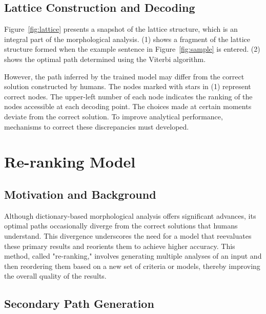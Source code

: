 \documentclass[AMS,STIX2COL]{WileyNJD-v2}
\begin{document}
    \subsection{Lattice Construction and Decoding}\label{subsec3.3}

    Figure~\ref{fig:lattice} presents a snapshot of the lattice structure, which is an integral part of the morphological analysis. (1) shows a fragment of the lattice structure formed when the example sentence in Figure~\ref{fig:sample} is entered. (2) shows the optimal path determined using the Viterbi algorithm.

    However, the path inferred by the trained model may differ from the correct solution constructed by humans. The nodes marked with stars in (1) represent correct nodes. The upper-left number of each node indicates the ranking of the nodes accessible at each decoding point. The choices made at certain moments deviate from the correct solution. To improve analytical performance, mechanisms to correct these discrepancies must developed.


    \section{Re-ranking Model}\label{sec:re-ranking-model}

    \subsection{Motivation and Background}\label{subsec4.1}

    Although dictionary-based morphological analysis offers significant advances, its optimal paths occasionally diverge from the correct solutions that humans understand. This divergence underscores the need for a model that reevaluates these primary results and reorients them to achieve higher accuracy. This method, called "re-ranking," involves generating multiple analyses of an input and then reordering them based on a new set of criteria or models, thereby improving the overall quality of the results.

    \subsection{Secondary Path Generation}\label{subsec4.2}
\end{document}
